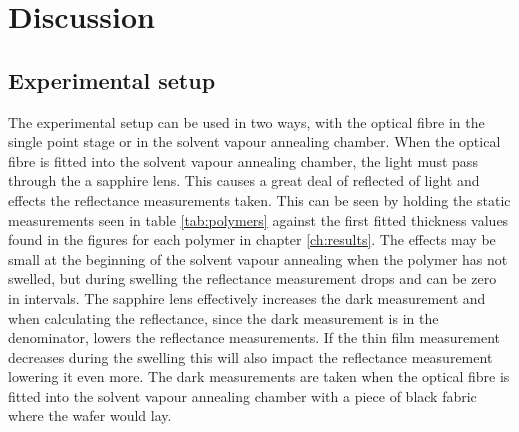 \documentclass[MasterThesisMain.tex]{subfiles}
\begin{document}
\chapter{Discussion}

\section{Experimental setup}
The experimental setup can be used in two ways, with the optical fibre in the single point stage or in the solvent vapour annealing chamber. When the optical fibre is fitted into the solvent vapour annealing chamber, the light must pass through the a sapphire lens. This causes a great deal of reflected of light and effects the reflectance measurements taken. This can be seen by holding the static measurements seen in table \ref{tab:polymers} against the first fitted thickness values found in the figures for each polymer in chapter \ref{ch:results}. The effects may be small at the beginning of the solvent vapour annealing when the polymer has not swelled, but during swelling the reflectance measurement drops and can be zero in intervals. The sapphire lens effectively increases the dark measurement and when calculating the reflectance, since the dark measurement is in the denominator, lowers the reflectance measurements. If the thin film measurement decreases during the swelling this will also impact the reflectance measurement lowering it even more. The dark measurements are taken when the optical fibre is fitted into the solvent vapour annealing chamber with a piece of black fabric where the wafer would lay. 
\end{document}
